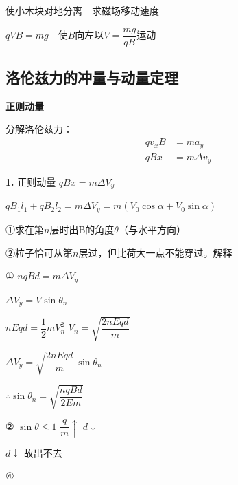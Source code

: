 \begin{problem}
使小木块对地分离　求磁场移动速度
\begin{solution}
$qVB=mg$　使$B$向左以$V=\dfrac{mg}{qB}$运动
\end{solution}
\end{problem}

\subsection{洛伦兹力的冲量与动量定理}
\textbf{正则动量}

分解洛伦兹力：
\begin{align*}
qv_xB &= ma_y\\
qBx &= m\Delta v_y %
\end{align*}

\textbf{1.} 正则动量 \quad $qBx=m\Delta V_y$ \quad {} \quad {}

$qB_1l_1+qB_2l_2=m\Delta V_y=m(V_0\cos\alpha+V_0\sin\alpha)$


\begin{problem}
①求在第$n$层时出B的角度$\theta$（与水平方向）

②粒子恰可从第$n$层过，但比荷大一点不能穿过。解释
\begin{solution}
① $nqBd=m\Delta V_y$

$\Delta V_y=V\sin\theta_n$

$nEqd=\dfrac12 mV_n^{2}$ \qquad $V_n=\sqrt{\dfrac{2nEqd}{m}}$

$\Delta V_y=\sqrt{\dfrac{2nEqd}{m}}\,\sin\theta_n$

$\therefore\sin\theta_n=\sqrt{\dfrac{nqBd}{2Em}}$ %

② $\sin\theta\le1$ \qquad $\dfrac{q}{m}\uparrow$ \qquad $d\downarrow$

$d\downarrow$ 故出不去
\end{solution}
\end{problem}

④

